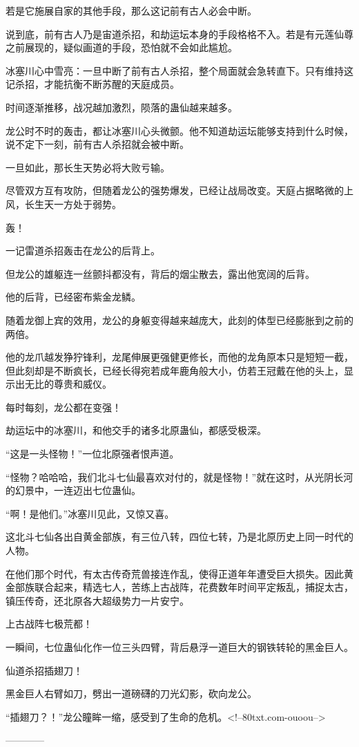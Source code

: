 \begin{this_body}
若是它施展自家的其他手段，那么这记前有古人必会中断。

说到底，前有古人乃是宙道杀招，和劫运坛本身的手段格格不入。若是有元莲仙尊之前展现的，疑似画道的手段，恐怕就不会如此尴尬。

冰塞川心中雪亮：一旦中断了前有古人杀招，整个局面就会急转直下。只有维持这记杀招，才能抗衡不断苏醒的天庭成员。

时间逐渐推移，战况越加激烈，陨落的蛊仙越来越多。

龙公时不时的轰击，都让冰塞川心头微颤。他不知道劫运坛能够支持到什么时候，说不定下一刻，前有古人杀招就会被中断。

一旦如此，那长生天势必将大败亏输。

尽管双方互有攻防，但随着龙公的强势爆发，已经让战局改变。天庭占据略微的上风，长生天一方处于弱势。

轰！

一记雷道杀招轰击在龙公的后背上。

但龙公的雄躯连一丝颤抖都没有，背后的烟尘散去，露出他宽阔的后背。

他的后背，已经密布紫金龙鳞。

随着龙御上宾的效用，龙公的身躯变得越来越庞大，此刻的体型已经膨胀到之前的两倍。

他的龙爪越发狰狞锋利，龙尾伸展更强健更修长，而他的龙角原本只是短短一截，但此刻却是不断疯长，已经长得宛若成年鹿角般大小，仿若王冠戴在他的头上，显示出无比的尊贵和威仪。

每时每刻，龙公都在变强！

劫运坛中的冰塞川，和他交手的诸多北原蛊仙，都感受极深。

“这是一头怪物！”一位北原强者恨声道。

“怪物？哈哈哈，我们北斗七仙最喜欢对付的，就是怪物！”就在这时，从光阴长河的幻景中，一连迈出七位蛊仙。

“啊！是他们。”冰塞川见此，又惊又喜。

这北斗七仙各出自黄金部族，有三位八转，四位七转，乃是北原历史上同一时代的人物。

在他们那个时代，有太古传奇荒兽接连作乱，使得正道年年遭受巨大损失。因此黄金部族联合起来，精选七人，苦练上古战阵，花费数年时间平定叛乱，捕捉太古，镇压传奇，还北原各大超级势力一片安宁。

上古战阵七极荒都！

一瞬间，七位蛊仙化作一位三头四臂，背后悬浮一道巨大的钢铁转轮的黑金巨人。

仙道杀招插翅刀！

黑金巨人右臂如刀，劈出一道磅礴的刀光幻影，砍向龙公。

“插翅刀？！”龙公瞳眸一缩，感受到了生命的危机。<!--80txt.com-ouoou-->

------------

\end{this_body}

